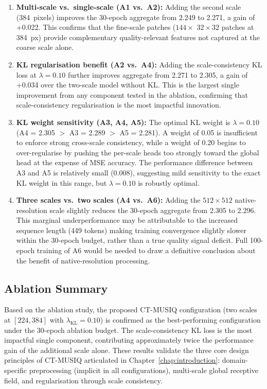 \begin{enumerate}
    \item \textbf{Multi-scale vs.\ single-scale (A1 vs.\ A2):} Adding the second scale
    (384~pixels) improves the 30-epoch aggregate from 2.249 to 2.271, a gain of +0.022.
    This confirms that the fine-scale patches ($144 \times$ $32 \times 32$ patches at
    384~px) provide complementary quality-relevant features not captured at the coarse
    scale alone.

    \item \textbf{KL regularisation benefit (A2 vs.\ A4):} Adding the scale-consistency
    KL loss at $\lambda = 0.10$ further improves aggregate from 2.271 to 2.305, a gain
    of +0.034 over the two-scale model without KL. This is the largest single improvement
    from any component tested in the ablation, confirming that scale-consistency
    regularisation is the most impactful innovation.

    \item \textbf{KL weight sensitivity (A3, A4, A5):} The optimal KL weight is
    $\lambda = 0.10$ (A4 = 2.305 $>$ A3 = 2.289 $>$ A5 = 2.281). A weight of 0.05 is
    insufficient to enforce strong cross-scale consistency, while a weight of 0.20
    begins to over-regularise by pushing the per-scale heads too strongly toward the
    global head at the expense of MSE accuracy. The performance difference between A3
    and A5 is relatively small (0.008), suggesting mild sensitivity to the exact KL
    weight in this range, but $\lambda = 0.10$ is robustly optimal.

    \item \textbf{Three scales vs.\ two scales (A4 vs.\ A6):} Adding the $512 \times 512$
    native-resolution scale slightly reduces the 30-epoch aggregate from 2.305 to 2.296.
    This marginal underperformance may be attributable to the increased sequence length
    (449 tokens) making training convergence slightly slower within the 30-epoch budget,
    rather than a true quality signal deficit. Full 100-epoch training of A6 would be
    needed to draw a definitive conclusion about the benefit of native-resolution
    processing.
\end{enumerate}

\subsection{Ablation Summary}

Based on the ablation study, the proposed CT-MUSIQ configuration (two scales at
$[224, 384]$ with $\lambda_{\text{KL}} = 0.10$) is confirmed as the best-performing
configuration under the 30-epoch ablation budget. The scale-consistency KL loss is the
most impactful single component, contributing approximately twice the performance gain of
the additional scale alone. These results validate the three core design principles of
CT-MUSIQ articulated in Chapter~\ref{chap:introduction}: domain-specific preprocessing
(implicit in all configurations), multi-scale global receptive field, and regularisation
through scale consistency.


